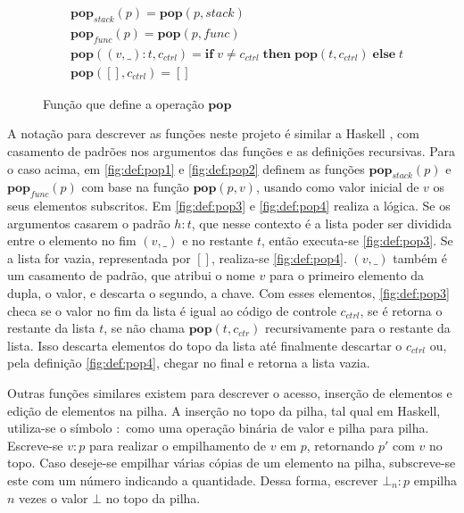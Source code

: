 \begin{figure}[h]
	\begin{align}
		&\mathbf{pop}_{stack}(p) = \mathbf{pop}(p, stack) \label{fig:def:pop1}\\
		&\mathbf{pop}_{func}(p) = \mathbf{pop}(p, func) \label{fig:def:pop2}\\
		&\mathbf{pop}((v, \_) : t, c_{ctrl}) = \mathbf{if} \; v \neq c_{ctrl} \;\mathbf{then} \; \mathbf{pop}(t, c_{ctrl}) \; \mathbf{else} \; t  \label{fig:def:pop3}\\
		&\mathbf{pop}([], c_{ctrl}) =  [] \label{fig:def:pop4}
	\end{align}
	\caption{Função que define a operação $\mathbf{pop}$}
	\label{fig:def:pop}
\end{figure}

A notação para descrever as funções neste projeto é similar a Haskell \cite{HASKELL}, com casamento de padrões nos argumentos das funções e as definições recursivas. Para o caso acima, em \ref{fig:def:pop1} e \ref{fig:def:pop2} definem as funções $\mathbf{pop}_{stack}(p)$ e $\mathbf{pop}_{func}(p)$ com base na função $\mathbf{pop}(p, v)$, usando como valor inicial de $v$ os seus elementos subscritos. Em \ref{fig:def:pop3} e \ref{fig:def:pop4} realiza a lógica. Se os argumentos casarem o padrão $h : t$, que nesse contexto é a lista poder ser dividida entre o elemento no fim $(v, \_)$ e no restante $t$, então executa-se \ref{fig:def:pop3}. Se a lista for vazia, representada por $[]$, realiza-se \ref{fig:def:pop4}. $(v,\_)$ também é um casamento de padrão, que atribui o nome $v$ para o primeiro elemento da dupla, o valor, e descarta o segundo, a chave. Com esses elementos, \ref{fig:def:pop3} checa se o valor no fim da lista é igual ao código de controle $c_{ctrl}$, se é retorna o restante da lista $t$, se não chama $\mathbf{pop}(t, c_{ctr})$ recursivamente para o restante da lista. Isso descarta elementos do topo da lista até finalmente descartar o $c_{ctrl}$ ou, pela definição \ref{fig:def:pop4}, chegar no final e retorna a lista vazia.

Outras funções similares existem para descrever o acesso, inserção de elementos e edição de elementos na pilha. A inserção no topo da pilha, tal qual em Haskell, utiliza-se o símbolo $:$ como uma operação binária de valor e pilha para pilha. Escreve-se $v : p$ para realizar o empilhamento de $v$ em $p$, retornando $p'$ com $v$ no topo. Caso deseje-se empilhar várias cópias de um elemento na pilha, subscreve-se este com um número indicando a quantidade. Dessa forma, escrever $\bot_n : p$ empilha $n$ vezes o valor $\bot$ no topo da pilha. 

